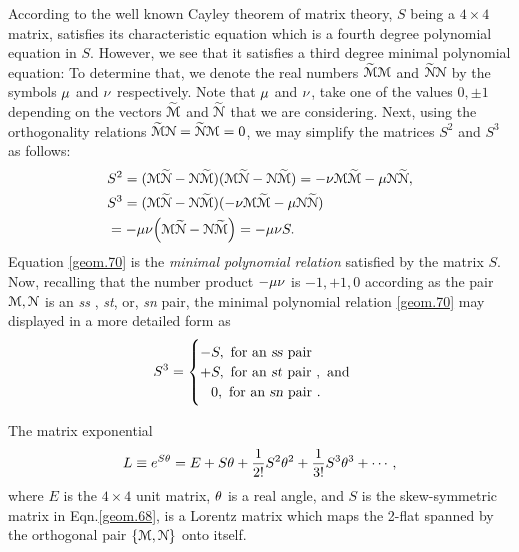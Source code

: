 { 
According to the well known Cayley theorem of matrix 
theory, $S$ being a $4\times 4$ matrix, satisfies its 
characteristic equation which is a fourth degree 
polynomial equation in $S$. However, we see that it 
satisfies a third degree {minimal polynomial 
equation}: To determine that,  we denote the real 
numbers $\EuScript{\tilde{M}}\EuScript{M}$ and 
$\EuScript{\tilde{N}}\EuScript{N}$ by the symbols 
$\gkm$ and $\gkn$ respectively. Note that $\gkm$ and 
$\gkn$, take one of the values $0, \pm 1$ depending on 
the vectors $\EuScript{\tilde{M}}$ and 
$\EuScript{\tilde{N}}$ that we are considering. Next, 
using the  orthogonality relations 
$\EuScript{\tilde{M}}\EuScript{N}= 
\EuScript{\tilde{N}}\EuScript{M}=0$, we may simplify 
the matrices $S^2$ and $S^3$ as follows:
\begin{align}\label{geom.69}
&S^2=(\EuScript{M}\EuScript{\tilde{N}}
-\EuScript{N}\EuScript{\tilde{M}}) (\EuScript{M}
\EuScript{\tilde{N}}
-\EuScript{N}\EuScript{\tilde{M}})=
-\gkn \EuScript{M} \EuScript{\tilde{M}} 
-\gkm\EuScript{N}
\EuScript{\tilde{N}},\\\label{geom.70}
&S^3= (\EuScript{M}\EuScript{\tilde{N}}
-\EuScript{N}\EuScript{\tilde{M}})
(-\gkn \EuScript{M} \EuScript{\tilde{M}}
-\gkm\EuScript{N} \EuScript{\tilde{N}})\notag\\&=
- \gkm\gkn \Big(\EuScript{M} \EuScript{\tilde{N}}
-\EuScript{N}\EuScript{\tilde{M}}\Big)=-\gkm\gkn S.
\end{align}
Equation \eqref{geom.70} is the \textsl{minimal 
polynomial relation} satisfied by the matrix $S$. Now, 
recalling that the number product $-\gkm\gkn$ is $-1, 
+1, 0$ according as the pair $\EuScript{M} 
,\EuScript{N}$ is an  \textsl{ss} , \textsl{st}, or, 
\textsl{sn} pair, the minimal polynomial relation 
\eqref{geom.70} may displayed in a more detailed form 
as
\begin{align}\label{geom.71}
 S^3=\begin{cases}  -S, \text{ for an \textsl{ss} pair 
}\\
       +S, \text{ for an \textsl{st} pair }, \text{ 
and}\\
       \phantom{-}0, \text{ for an \textsl{sn} pair }.
\end{cases}
\end{align}

\Lem The matrix exponential
\begin{align}\label{geom.72} L\equiv
e^{S\gkq}=E+S\gkq+\frac{1}{2!}{S^2}\gkq^2
+\frac{1}{3!}{S^3}\gkq^3 +\cdots,
\end{align}
where $E$ is the $4\times 4$ unit matrix, $\gkq$ is a 
real angle, and $S$ is the skew-symmetric matrix in 
Eqn.\eqref{geom.68}, is a Lorentz matrix which maps 
the 
2-flat spanned by the orthogonal pair  
$\{\EuScript{M}, 
\EuScript{N}\} $ onto itself.

}
